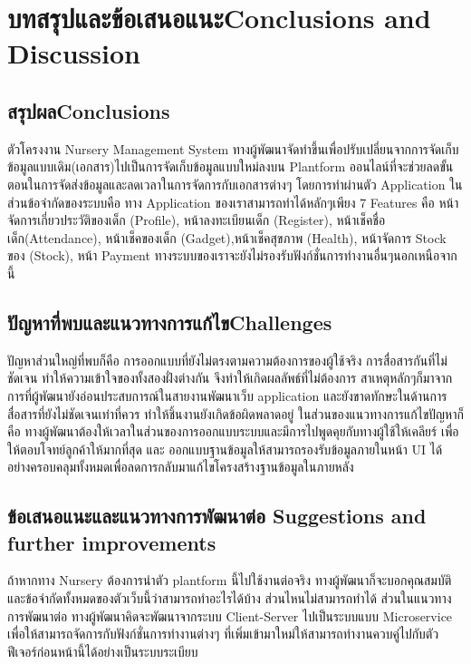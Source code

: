 \chapter{\ifcpe บทสรุปและข้อเสนอแนะ\else Conclusions and Discussion\fi}

\section{\ifcpe สรุปผล\else Conclusions\fi}

ตัวโครงงาน  Nursery Management System  ทางผู้พัฒนาจัดทำขึ้นเพื่อปรับเปลี่ยนจากการจัดเก็บข้อมูลแบบเดิม(เอกสาร)ไปเป็นการจัดเก็บข้อมูลแบบใหม่ลงบน Plantform ออนไลน์ที่จะช่วยลดขั้นตอนในการจัดส่งข้อมูลและลดเวลาในการจัดการกับเอกสารต่างๆ โดยการทำผ่านตัว Application ในส่วนข้อจำกัดของระบบคือ ทาง Application ของเราสามารถทำได้หลักๆเพียง 7 Features คือ หน้าจัดการเกี่ยวประวัติของเด็ก (Profile), หน้าลงทะเบียนเด็ก (Register), หน้าเช็คชื่อเด็ก(Attendance), หน้าเช็คของเด็ก (Gadget),หน้าเช็คสุขภาพ (Health), หน้าจัดการ Stock ของ (Stock), หน้า Payment ทางระบบของเราจะยังไม่รองรับฟังก์ชั่นการทำงานอื่นๆนอกเหนือจากนี้

\section{\ifcpe ปัญหาที่พบและแนวทางการแก้ไข\else Challenges\fi}

ปัญหาส่วนใหญ่ที่พบก็คือ การออกแบบที่ยังไม่ตรงตามความต้องการของผู้ใช้จริง  การสื่อสารกันที่ไม่ชัดเจน ทำให้ความเข้าใจของทั้งสองฝั่งต่างกัน จึงทำให้เกิดผลลัพธ์ที่ไม่ต้องการ  สาเหตุหลักๆก็มาจากการที่ผู้พัฒนายังอ่อนประสบการณ์ในสายงานพัฒนาเว็บ application และยังขาดทักษะในด้านการสื่อสารที่ยังไม่ชัดเจนเท่าที่ควร ทำให้ชิ้นงานยังเกิดข้อผิดพลาดอยู่
ในส่วนของแนวทางการแก้ไขปัญหาก็คือ ทางผู้พัฒนาต้องให้เวลาในส่วนของการออกแบบระบบและมีการไปพูดคุยกับทางผู้ใช้ให้เคลียร์ เพื่อให้ตอบโจทย์ลูกค้าให้มากที่สุด และ ออกแบบฐานข้อมูลให้สามารถรองรับข้อมูลภายในหน้า UI ได้อย่างครอบคลุมทั้งหมดเพื่อลดการกลับมาแก้ไขโครงสร้างฐานข้อมูลในภายหลัง

\section{\ifcpe%
ข้อเสนอแนะและแนวทางการพัฒนาต่อ
\else%
Suggestions and further improvements
\fi
}

ถ้าหากทาง Nursery ต้องการนำตัว plantform นี้ไปใช้งานต่อจริง ทางผู้พัฒนาก็จะบอกคุณสมบัติและข้อจำกัดทั้งหมดของตัวเว็บนี้ว่าสามารถทำอะไรได้บ้าง ส่วนไหนไม่สามารถทำได้
ส่วนในแนวทางการพัฒนาต่อ  ทางผู้พัฒนาคิดจะพัฒนาจากระบบ Client-Server ไปเป็นระบบแบบ Microservice เพื่อให้สามารถจัดการกับฟังก์ชั่นการทำงานต่างๆ ที่เพิ่มเข้ามาใหม่ให้สามารถทำงานควบคู่ไปกับตัวฟีเจอร์ก่อนหน้านี้ได้อย่างเป็นระบบระเบียบ

